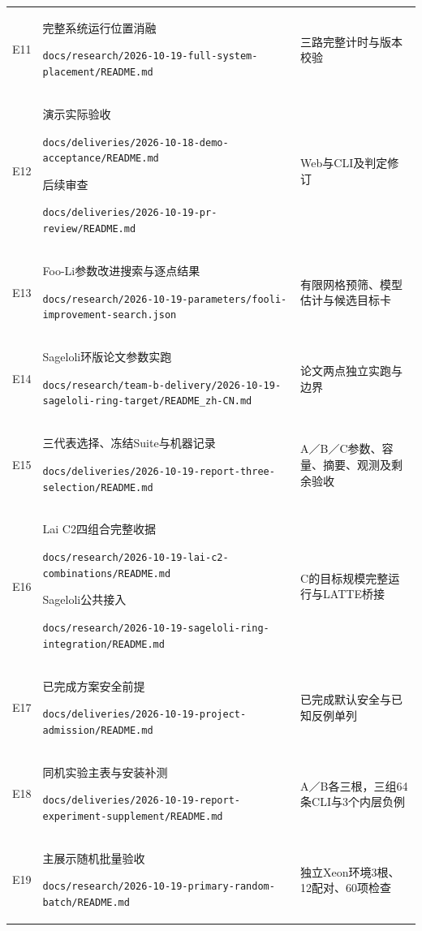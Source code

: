 \documentclass[UTF8,a4paper,12pt,oneside,openany,fontset=fandol]{ctexrep}
\newcommand{\evidenceitem}[2]{\noindent #1\par{\noindent\scriptsize\color{black!70}\nolinkurl{#2}\par}\smallskip}
\newlength{\tableavail}
\begin{document}
\begin{longtable}{@{}>{\raggedright\arraybackslash}p{0.09\tableavail}>{\raggedright\arraybackslash}p{0.55\tableavail}>{\raggedright\arraybackslash}p{0.36\tableavail}@{}}
E11 & \evidenceitem{完整系统运行位置消融}{docs/research/2026-10-19-full-system-placement/README.md} & 三路完整计时与版本校验 \\
E12 & \evidenceitem{演示实际验收}{docs/deliveries/2026-10-18-demo-acceptance/README.md}\evidenceitem{后续审查}{docs/deliveries/2026-10-19-pr-review/README.md} & Web与CLI及判定修订 \\
E13 & \evidenceitem{Foo-Li参数改进搜索与逐点结果}{docs/research/2026-10-19-parameters/fooli-improvement-search.json} & 有限网格预筛、模型估计与候选目标卡 \\
E14 & \evidenceitem{Sageloli环版论文参数实跑}{docs/research/team-b-delivery/2026-10-19-sageloli-ring-target/README_zh-CN.md} & 论文两点独立实跑与边界 \\
E15 & \evidenceitem{三代表选择、冻结Suite与机器记录}{docs/deliveries/2026-10-19-report-three-selection/README.md} & A／B／C参数、容量、摘要、观测及剩余验收 \\
E16 & \evidenceitem{Lai C2四组合完整收据}{docs/research/2026-10-19-lai-c2-combinations/README.md}\evidenceitem{Sageloli公共接入}{docs/research/2026-10-19-sageloli-ring-integration/README.md} & C的目标规模完整运行与LATTE桥接 \\
E17 & \evidenceitem{已完成方案安全前提}{docs/deliveries/2026-10-19-project-admission/README.md} & 已完成默认安全与已知反例单列 \\
E18 & \evidenceitem{同机实验主表与安装补测}{docs/deliveries/2026-10-19-report-experiment-supplement/README.md} & A／B各三根，三组64条CLI与3个内层负例 \\
E19 & \evidenceitem{主展示随机批量验收}{docs/research/2026-10-19-primary-random-batch/README.md} & 独立Xeon环境3根、12配对、60项检查 \\
\end{longtable}
\endgroup
\end{document}
